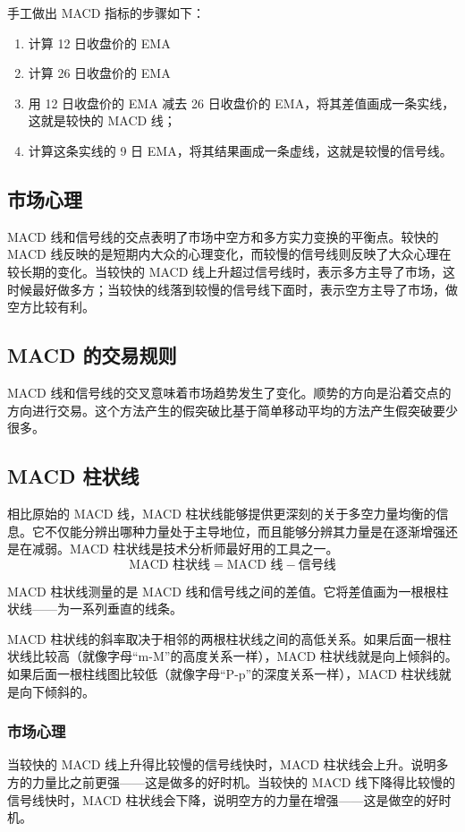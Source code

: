 手工做出 MACD 指标的步骤如下：
\begin{enumerate}
    \item 计算 12 日收盘价的 EMA
    \item 计算 26 日收盘价的 EMA
    \item 用 12 日收盘价的 EMA 减去 26 日收盘价的 EMA，将其差值画成一条实线，这就是较快的 MACD 线；
    \item 计算这条实线的 9 日 EMA，将其结果画成一条虚线，这就是较慢的信号线。
\end{enumerate}
\subsection*{市场心理}
MACD 线和信号线的交点表明了市场中空方和多方实力变换的平衡点。较快的 MACD 线反映的是短期内大众的心理变化，而较慢的信号线则反映了大众心理在较长期的变化。当较快的 MACD 线上升超过信号线时，表示多方主导了市场，这时候最好做多方；当较快的线落到较慢的信号线下面时，表示空方主导了市场，做空方比较有利。
\subsection*{MACD 的交易规则}
MACD 线和信号线的交叉意味着市场趋势发生了变化。顺势的方向是沿着交点的方向进行交易。这个方法产生的假突破比基于简单移动平均的方法产生假突破要少很多。

\subsection{MACD 柱状线}
相比原始的 MACD 线，MACD 柱状线能够提供更深刻的关于多空力量均衡的信息。它不仅能分辨出哪种力量处于主导地位，而且能够分辨其力量是在逐渐增强还是在减弱。MACD 柱状线是技术分析师最好用的工具之一。
\begin{equation}
    \text{MACD 柱状线}=\text{MACD 线}-\text{信号线}
\end{equation}

MACD 柱状线测量的是 MACD 线和信号线之间的差值。它将差值画为一根根柱状线——为一系列垂直的线条。

MACD 柱状线的斜率取决于相邻的两根柱状线之间的高低关系。如果后面一根柱状线比较高（就像字母“m-M”的高度关系一样），MACD 柱状线就是向上倾斜的。如果后面一根柱线图比较低（就像字母“P-p”的深度关系一样），MACD 柱状线就是向下倾斜的。
\subsubsection*{市场心理}
当较快的 MACD 线上升得比较慢的信号线快时，MACD 柱状线会上升。说明多方的力量比之前更强——这是做多的好时机。当较快的 MACD 线下降得比较慢的信号线快时，MACD 柱状线会下降，说明空方的力量在增强——这是做空的好时机。


